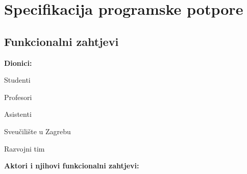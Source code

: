 \chapter{Specifikacija programske potpore}

\section{Funkcionalni zahtjevi}

\noindent \textbf{Dionici:}

\begin{packed_enum}

\item Studenti
\item Profesori
\item Asistenti
\item Sveučilište u Zagrebu
\item Razvojni tim

\end{packed_enum}

\noindent \textbf{Aktori i njihovi funkcionalni zahtjevi:}

